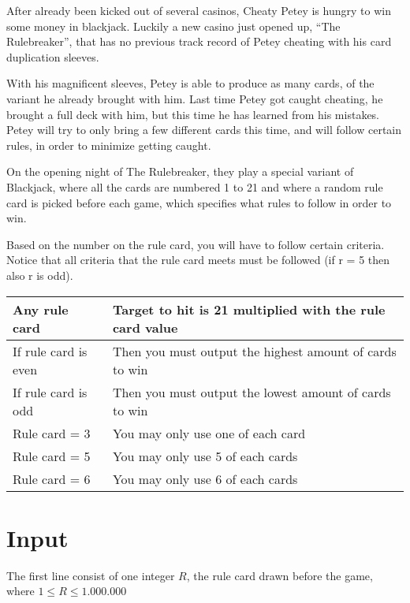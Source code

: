 
After already been kicked out of several casinos, Cheaty Petey is hungry to win some money in blackjack. Luckily a new casino just opened up, “The Rulebreaker”, that has no previous track record of Petey cheating with his card duplication sleeves.

With his magnificent sleeves, Petey is able to produce as many cards, of the variant he already brought with him. Last time Petey got caught cheating, he brought a full deck with him, but this time he has learned from his mistakes. Petey will try to only bring a few different cards this time, and will follow certain rules, in order to minimize getting caught.

On the opening night of The Rulebreaker, they play a special variant of Blackjack, where all the cards are numbered 1 to 21 and where a random rule card is picked before each game, which specifies what rules to follow in order to win. 

Based on the number on the rule card, you will have to follow certain criteria. Notice that all criteria that the rule card meets must be followed (if r = 5 then also r is odd). 


\begin{tabular}{|ll|}
\hline
\textbf{Any rule card} & \textbf{Target to hit is 21 multiplied with the rule card value} \\ \hline
If rule card is even & Then you must output the highest amount of cards to win \\ \hline
If rule card is odd   & Then you must output the lowest amount of cards to win  \\ \hline
Rule card = 3         & You may only use one of each card                       \\ \hline
Rule card = 5         & You may only use 5 of each cards                        \\ \hline
Rule card = 6         & You may only use 6 of each cards                        \\ \hline
\end{tabular}

\section*{Input}
The first line consist of one integer $R$, the rule card drawn before the game, where 
$1\leq R \leq 1.000.000$

